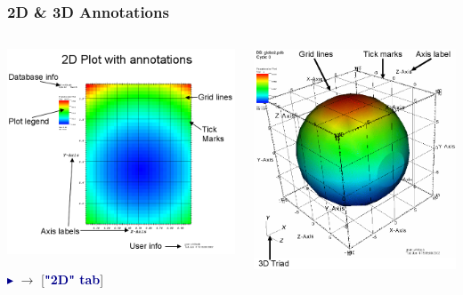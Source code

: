 \begin{frame}
\frametitle{2D \& 3D Annotations}
\begin{columns}
\begin{column}{5.75cm}
	\includegraphics[width=\columnwidth]{figs/visit-guis/visit_2d-objects}

	\vspace{2mm}
	\textcolor{DarkBlue}{$\blacktriangleright$}
         $\rightarrow$ 
		[\textcolor{DarkBlue}{\bf "2D" tab}]
\end{column}
\begin{column}{5.25cm}
        \includegraphics[width=\columnwidth]{figs/visit-guis/visit_3d-objects}


\end{column}
\end{columns}
\end{frame}
